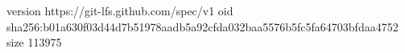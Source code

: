 version https://git-lfs.github.com/spec/v1
oid sha256:b01a630f03d44d7b51978aadb5a92cfda032baa5576b5fc5fa64703bfdaa4752
size 113975
